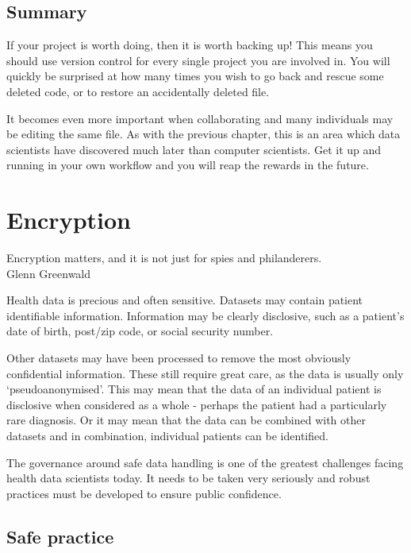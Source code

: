 \documentclass[
  12pt,
  krantz2]{krantz}
\renewenvironment{quote}{\begin{VF}}{\end{VF}}
\begin{document}
\hypertarget{summary-5}{%
\section{Summary}\label{summary-5}}

If your project is worth doing, then it is worth backing up!
This means you should use version control for every single project you are involved in.
You will quickly be surprised at how many times you wish to go back and rescue some deleted code, or to restore an accidentally deleted file.

It becomes even more important when collaborating and many individuals may be editing the same file.
As with the previous chapter, this is an area which data scientists have discovered much later than computer scientists.
Get it up and running in your own workflow and you will reap the rewards in the future.

\hypertarget{encryption}{%
\chapter{Encryption}\label{encryption}}


\begin{quote}
Encryption matters, and it is not just for spies and philanderers.\\
Glenn Greenwald
\end{quote}

Health data is precious and often sensitive.
Datasets may contain patient identifiable information.
Information may be clearly disclosive, such as a patient's date of birth, post/zip code, or social security number.

Other datasets may have been processed to remove the most obviously confidential information.
These still require great care, as the data is usually only `pseudoanonymised'.
This may mean that the data of an individual patient is disclosive when considered as a whole - perhaps the patient had a particularly rare diagnosis.
Or it may mean that the data can be combined with other datasets and in combination, individual patients can be identified.

The governance around safe data handling is one of the greatest challenges facing health data scientists today.
It needs to be taken very seriously and robust practices must be developed to ensure public confidence.

\hypertarget{safe-practice}{%
\section{Safe practice}\label{safe-practice}}
\end{document}
